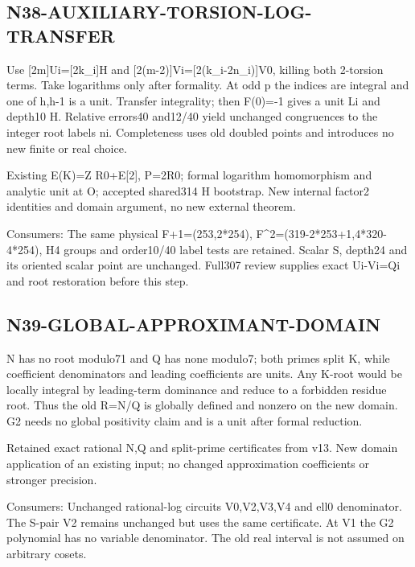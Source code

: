 \documentclass{article}
\begin{document}
\subsection{N38-AUXILIARY-TORSION-LOG-TRANSFER}
\label{outline:r5-n38-auxiliary-torsion-log-transfer}
Use [2m]Ui=[2k\_i]H and [2(m-2)]Vi=[2(k\_i-2n\_i)]V0, killing both 2-torsion terms. Take logarithms only after formality. At odd p the indices are integral and one of h,h-1 is a unit. Transfer integrality; then F(0)=-1 gives a unit Li and depth10 H. Relative errors40 and12/40 yield unchanged congruences to the integer root labels ni. Completeness uses old doubled points and introduces no new finite or real choice.
\par Existing E(K)=Z R0+E[2], P=2R0; formal logarithm homomorphism and analytic unit at O; accepted shared314 H bootstrap. New internal factor2 identities and domain argument, no new external theorem.
\par Consumers: The same physical F+1=(253,2*254), F\textasciicircum{}2=(319-2*253+1,4*320-4*254), H4 groups and order10/40 label tests are retained. Scalar S, depth24 and its oriented scalar point are unchanged. Full307 review supplies exact Ui-Vi=Qi and root restoration before this step.
\subsection{N39-GLOBAL-APPROXIMANT-DOMAIN}
\label{outline:r5-n39-global-approximant-domain}
N has no root modulo71 and Q has none modulo7; both primes split K, while coefficient denominators and leading coefficients are units. Any K-root would be locally integral by leading-term dominance and reduce to a forbidden residue root. Thus the old R=N/Q is globally defined and nonzero on the new domain. G2 needs no global positivity claim and is a unit after formal reduction.
\par Retained exact rational N,Q and split-prime certificates from v13. New domain application of an existing input; no changed approximation coefficients or stronger precision.
\par Consumers: Unchanged rational-log circuits V0,V2,V3,V4 and ell0 denominator. The S-pair V2 remains unchanged but uses the same certificate. At V1 the G2 polynomial has no variable denominator. The old real interval is not assumed on arbitrary cosets.
\end{document}
